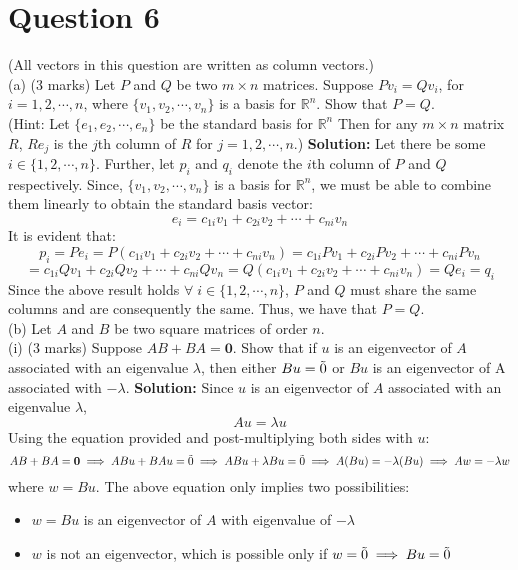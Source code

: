 \documentclass{article}
\begin{document}
\section*{Question 6}
\newline
 (All vectors in this question are written as column vectors.)
\newline
\\ (a) (3 marks) Let $P$ and $Q$ be two $m \times n$ matrices.
Suppose $P v_i = Q v_i$, for $i = 1, 2, \cdots, n$, where $\{v_1, v_2, \cdots , v_n\}$ is a basis for $\mathbb{R}^n$. Show that $P = Q$.
\\ (Hint: Let $\{e_1, e_2, \cdots , e_n\}$ be the standard basis for $\mathbb{R}^n$ Then for any $m \times n$ matrix $R$, $Re_j$ is the $j$th column of $R$ for $j = 1, 2, \cdots, n$.)
\newline
\textbf{Solution:} 
Let there be some $i \in \{1,2, \cdots, n\}$. Further, let $p_i$ and $q_i$ denote the $i$th column of $P$ and $Q$ respectively. Since, $\{v_1, v_2, \cdots, v_n\}$ is a basis for $\mathbb{R}^n$, we must be able to combine them linearly to obtain the standard basis vector:
$$e_i = c_{1i} v_1 + c_{2i} v_2 + \cdots + c_{ni} v_n$$
It is evident that:
$$p_i = Pe_i = P(c_{1i} v_1 + c_{2i} v_2 + \cdots + c_{ni} v_n) =c_{1i} P v_1 + c_{2i} P v_2 + \cdots + c_{ni} P v_n$$
$$=c_{1i} Q v_1 + c_{2i} Q v_2 + \cdots + c_{ni} Q v_n = Q(c_{1i} v_1 + c_{2i} v_2 + \cdots + c_{ni} v_n) = Qe_i = q_i$$
Since the above result holds $\forall \; i \in \{1,2,\cdots, n\}$, $P$ and $Q$ must share the same columns and are consequently the same. Thus, we have that $P = Q$.
\newline
\\ (b) Let $A$ and $B$ be two square matrices of order $n$.
\newline
\\ (i) (3 marks) Suppose $AB + BA = \bm{0}$. Show that if $u$ is an eigenvector of $A$ associated with an eigenvalue $\lambda$, then either $Bu = \Tilde{0}$ or $Bu$ is an eigenvector of A associated with $-\lambda$.
\newline
\textbf{Solution:}
Since $u$ is an eigenvector of $A$ associated with an eigenvalue $\lambda$,
$$Au = \lambda u$$
Using the equation provided and post-multiplying both sides with $u$:
$$AB + BA = \bm{0} \implies ABu + BAu = \Tilde{0} \implies ABu + \lambda Bu = \Tilde{0} \implies A(Bu) = -\lambda (Bu) \implies Aw = -\lambda w$$
where $w = Bu$. The above equation only implies two possibilities:
\begin{itemize}
    \item $w = Bu$ is an eigenvector of $A$ with eigenvalue of $-\lambda$
    \item $w$ is not an eigenvector, which is possible only if $w = \Tilde{0} \implies Bu = \Tilde{0}$
\end{itemize}
\end{document}

